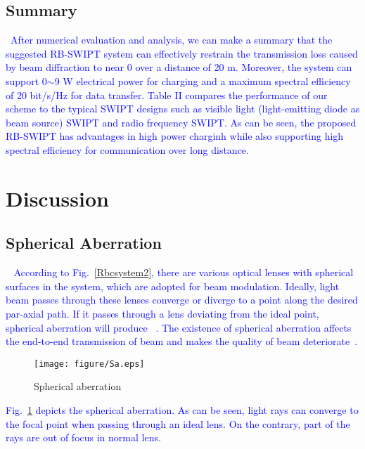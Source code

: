 \documentclass{IEEEtran}
\begin{document}
\subsection{Summary}\
\textcolor{blue}{After numerical evaluation and analysis, we can make a summary that the suggested RB-SWIPT system can effectively restrain the transmission loss caused by beam diffraction to near 0 over a distance of 20 m. Moreover, the system can support 0$\sim$9 W electrical power for charging and a maximum spectral efficiency of 20 bit/s/Hz for data transfer. Table II compares the performance of our scheme to the typical SWIPT designs such as visible light (light-emitting diode as beam source) SWIPT and radio frequency SWIPT. As can be seen, the proposed RB-SWIPT has advantages in high power charginh while also supporting high spectral efficiency for communication over long distance.}
\section{Discussion}
\subsection{Spherical Aberration}\
\textcolor{blue}{%
According to Fig.~\ref{Rbcsystem2}, there are various optical lenses with spherical surfaces in the system, which are adopted for beam modulation. 
Ideally, light beam passes through these lenses converge or diverge to a point along the desired par-axial path. If it passes through a lens deviating from the ideal point, spherical aberration will produce~
\cite{Sa}. The existence of spherical aberration affects the end-to-end transmission of beam and makes the quality of beam deteriorate~\cite{sheng2022intracavity,Sa,wang2021laguerre}. }
\begin{figure}[t]
	\centering
	\texttt{[image: figure/Sa.eps]}
	\caption{Spherical aberration}
	\label{Sa}
\end{figure}
\textcolor{blue}{Fig.~\ref{Sa} depicts the spherical aberration. As can be seen, light rays can converge to the focal point when passing through an ideal lens. On the contrary, part of the rays are out of focus in normal lens.} 
\end{document}
